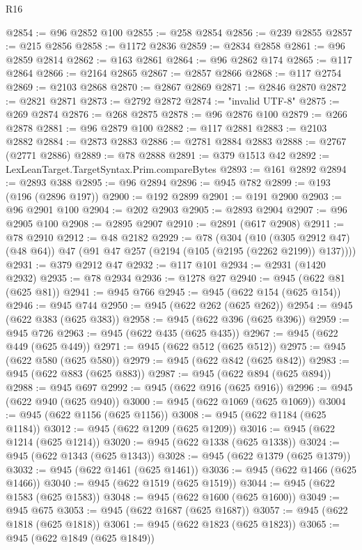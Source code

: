\begin{lexlean}{R16}
\begin{coremodule}
@2854 := @96 @2852 @100
@2855 := @258 @2854
@2856 := @239 @2855
@2857 := @215 @2856
@2858 := @1172 @2836
@2859 := @2834 @2858
@2861 := @96 @2859 @2814
@2862 := @163 @2861
@2864 := @96 @2862 @174
@2865 := @117 @2864
@2866 := @2164 @2865
@2867 := @2857 @2866
@2868 := @117 @2754
@2869 := @2103 @2868
@2870 := @2867 @2869
@2871 := @2846 @2870
@2872 := @2821 @2871
@2873 := @2792 @2872
@2874 := "invalid UTF-8"
@2875 := @269 @2874
@2876 := @268 @2875
@2878 := @96 @2876 @100
@2879 := @266 @2878
@2881 := @96 @2879 @100
@2882 := @117 @2881
@2883 := @2103 @2882
@2884 := @2873 @2883
@2886 := @2781 @2884 @2883
@2888 := @2767 (@2771 @2886)
@2889 := @78 @2888
@2891 := @379 @1513 @42
@2892 := LexLeanTarget.TargetSyntax.Prim.compareBytes
@2893 := @161 @2892
@2894 := @2893 @388
@2895 := @96 @2894
@2896 := @945 @782
@2899 := @193 (@196 (@2896 @197))
@2900 := @192 @2899
@2901 := @191 @2900
@2903 := @96 @2901 @100
@2904 := @202 @2903
@2905 := @2893 @2904
@2907 := @96 @2905 @100
@2908 := @2895 @2907
@2910 := @2891 (@617 @2908)
@2911 := @78 @2910
@2912 := @48 @2182
@2929 := @78
    (@304
      (@10 (@305 @2912 @47) (@48 @64))
      @47
      (@91 @47 @257 (@2194 (@105 (@2195 (@2262 @2199)) @137))))
@2931 := @379 @2912 @47
@2932 := @117 @101
@2934 := @2931 (@1420 @2932)
@2935 := @78 @2934
@2936 := @1278 @27
@2940 := @945 (@622 @81 (@625 @81))
@2941 := @945 @766
@2945 := @945 (@622 @154 (@625 @154))
@2946 := @945 @744
@2950 := @945 (@622 @262 (@625 @262))
@2954 := @945 (@622 @383 (@625 @383))
@2958 := @945 (@622 @396 (@625 @396))
@2959 := @945 @726
@2963 := @945 (@622 @435 (@625 @435))
@2967 := @945 (@622 @449 (@625 @449))
@2971 := @945 (@622 @512 (@625 @512))
@2975 := @945 (@622 @580 (@625 @580))
@2979 := @945 (@622 @842 (@625 @842))
@2983 := @945 (@622 @883 (@625 @883))
@2987 := @945 (@622 @894 (@625 @894))
@2988 := @945 @697
@2992 := @945 (@622 @916 (@625 @916))
@2996 := @945 (@622 @940 (@625 @940))
@3000 := @945 (@622 @1069 (@625 @1069))
@3004 := @945 (@622 @1156 (@625 @1156))
@3008 := @945 (@622 @1184 (@625 @1184))
@3012 := @945 (@622 @1209 (@625 @1209))
@3016 := @945 (@622 @1214 (@625 @1214))
@3020 := @945 (@622 @1338 (@625 @1338))
@3024 := @945 (@622 @1343 (@625 @1343))
@3028 := @945 (@622 @1379 (@625 @1379))
@3032 := @945 (@622 @1461 (@625 @1461))
@3036 := @945 (@622 @1466 (@625 @1466))
@3040 := @945 (@622 @1519 (@625 @1519))
@3044 := @945 (@622 @1583 (@625 @1583))
@3048 := @945 (@622 @1600 (@625 @1600))
@3049 := @945 @675
@3053 := @945 (@622 @1687 (@625 @1687))
@3057 := @945 (@622 @1818 (@625 @1818))
@3061 := @945 (@622 @1823 (@625 @1823))
@3065 := @945 (@622 @1849 (@625 @1849))

\end{coremodule}
\end{lexlean}
